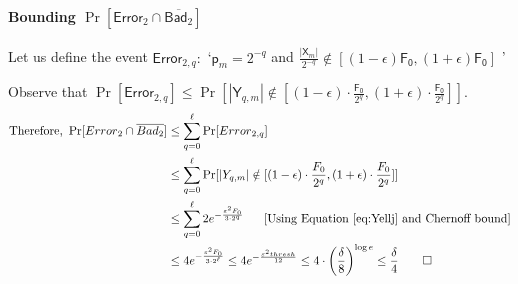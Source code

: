 \documentclass[a4paper,UKenglish,cleveref, autoref, thm-restate]{lipics-v2021}
\makeatletter
\newenvironment{proof*}[1][\proofname]{\par
  \pushQED{\qed}
  \normalfont \partopsep=\z@skip \topsep=\z@skip
  \trivlist
  \item[\hskip\labelsep
        \itshape
    #1\@addpunct{.}]\ignorespaces
}{
  \popQED\endtrivlist\@endpefalse
}
\newcommand{\Fo}{\ensuremath{\mathsf{F_0}}}
\newcommand{\p}{\mathsf{p}}
\newcommand{\Error}{\mathsf{Error}}
\newcommand{\bad}{\ensuremath{\mathsf{Bad}_{2}}}
\newcommand{\thresh}{\mathsf{thresh}}
\makeatother
\begin{document}
\begin{proof*}
\paragraph*{Bounding $\Pr [\Error_{2}\cap \overline{\bad}]$}








Let us define the event
$\Error_{2,q}:$ `$\p_m = 2^{-q}$ and $ \frac{|\mathsf{X}_{m}|}{2^{-q}} \notin [(1-\epsilon)\Fo, (1+\epsilon)\Fo]$ ' 

\smallskip

\noindent Observe that $\Pr[\Error_{2,q}] \leq \Pr[|\mathsf{Y}_{q,m}| \notin [(1-\epsilon)\cdot\frac{\Fo}{2^q}, (1+\epsilon)\cdot\frac{\Fo}{2^q}]]$. 
\vspace{-1em}
\begin{align*}
  \text{Therefore, }  \Pr [\Error_{2} \cap  \overline{\bad}] &\leq 
  
  \sum_{q =0}^{\ell} \Pr[\Error_{2,q}] \\
    &\leq \sum_{q =0}^{\ell} \Pr[|\mathsf{Y}_{q,m}| \notin [(1-\epsilon)\cdot\frac{\Fo}{2^q}, (1+\epsilon)\cdot\frac{\Fo}{2^q}]]\\

  
  
 
 & \leq \sum_{q = 0}^{\ell} 2  e^{-\frac{\varepsilon^2 \Fo}{3 \cdot 2^q}} \hfill \ \ \ \ \ [\text{{Using Equation~\ref{eq:Yellj} and Chernoff bound}}]\\

  
  & \leq 4 e^{-\frac{\varepsilon^2 \Fo}{3 \cdot 2^{\ell}}} \leq 4e^{-\frac{\varepsilon^2\thresh}{12}} \leq 4\cdot \left(\frac{\delta}{8}\right)^{\log e} \leq  \frac{\delta}{4} \qedhere 
                      \end{align*}



\end{proof*}
\end{document}
